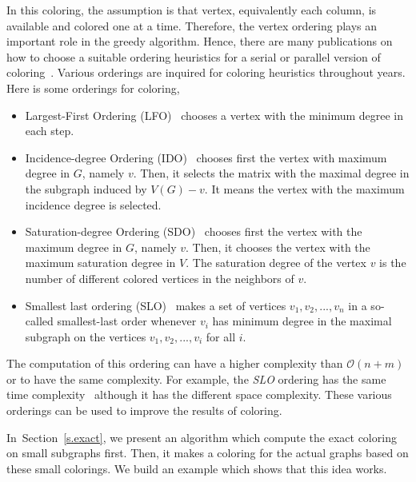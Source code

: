\documentclass[11pt, twoside,a4paper]{book}
\newcommand{\secref}[1]{Section~\protect\ref{#1}}
\begin{document}
In this coloring, the assumption is that vertex,
equivalently each column, is available and colored one at a time.
Therefore, the vertex ordering plays an important role in the greedy algorithm.
Hence, there are many publications on how to choose
a suitable ordering heuristics for a serial or parallel version of
coloring~\cite{ordering1,ordering2,ordering3}.
Various orderings are inquired for coloring heuristics
throughout years. Here is some orderings for coloring,
\begin{itemize}
\item Largest-First Ordering (LFO)~\cite{LFO} chooses a vertex with the minimum degree in each step.
\item Incidence-degree Ordering (IDO)~\cite{IDO} chooses first the vertex with maximum degree in $G$, namely $v$. Then, it selects the matrix with the maximal degree in the subgraph induced by $V(G)-v$. It means the vertex with the maximum incidence degree is selected.
\item Saturation-degree Ordering (SDO)~\cite{SDO} chooses first the vertex with the maximum degree in $G$, namely $v$. Then, it chooses the vertex with the maximum saturation degree in
$V$. The saturation degree of the vertex $v$ is the number of different colored vertices in the neighbors of $v$.
\item Smallest last ordering (SLO)~\cite{ordering1} makes a set of vertices ${v_1,v_2,...,v_n}$ in a so-called smallest-last
order whenever $v_i$ has minimum degree in the maximal subgraph on the vertices $v_1,v_2,...,v_i$ for all $i$.
\end{itemize}
The computation of this ordering can have a higher complexity than $\mathcal{O}(n+m)$ or to have the same complexity. For example, the \textit{SLO} ordering has the same time complexity~\cite{ordering1} although it has the different space complexity.
These various orderings can be used to improve the results of coloring.

In~\secref{s.exact}, we present an algorithm which compute the exact coloring
on small subgraphs first. Then, it makes a coloring for the actual graphs
based on these small colorings. We build an example which shows that this idea
works. 

\end{document}
